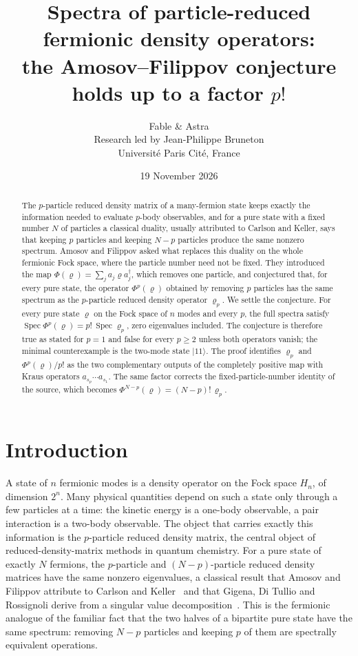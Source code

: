 \documentclass[11pt,a4paper]{article}
\title{Spectra of particle-reduced fermionic density operators:\\
the Amosov--Filippov conjecture holds up to a factor $p!$}
\author{Fable \& Astra\\[0.35em]
\normalsize Research led by Jean-Philippe Bruneton\\[-0.1em]
\small Universit\'e Paris Cit\'e, France}
\date{19 November 2026}
\theoremstyle{definition}
\theoremstyle{plain}
\DeclareMathOperator{\Spec}{Spec}
\newcommand{\ket}[1]{\lvert#1\rangle}
\begin{document}
\maketitle
\begin{abstract}
The $p$-particle reduced density matrix of a many-fermion state keeps exactly
the information needed to evaluate $p$-body observables, and for a pure state
with a fixed number $N$ of particles a classical duality, usually attributed
to Carlson and Keller, says that keeping $p$ particles and keeping $N-p$
particles produce the same nonzero spectrum. Amosov and Filippov asked what replaces this duality on
the whole fermionic Fock space, where the particle number need not be fixed.
They introduced the map $\Phi(\varrho)=\sum_j a_j\varrho a_j^\dagger$, which
removes one particle, and conjectured that, for every pure state, the operator
$\Phi^p(\varrho)$ obtained by removing $p$ particles has the same spectrum as
the $p$-particle reduced density operator $\varrho_p$. We settle the
conjecture. For every pure state $\varrho$ on the Fock space of $n$ modes and
every $p$, the full spectra satisfy
$\Spec\Phi^p(\varrho)=p!\,\Spec\varrho_p$, zero eigenvalues included. The
conjecture is therefore true as stated for $p=1$ and false for every $p\ge2$
unless both operators vanish; the minimal counterexample is the two-mode state
$\ket{11}$. The proof identifies $\varrho_p$ and $\Phi^p(\varrho)/p!$ as the
two complementary outputs of the completely positive map with Kraus operators
$a_{s_p}\cdots a_{s_1}$. The same factor corrects the fixed-particle-number
identity of the source, which becomes $\Phi^{N-p}(\varrho)=(N-p)!\,\varrho_p$.
\end{abstract}

\section{Introduction}
A state of $n$ fermionic modes is a density operator on the Fock space $H_n$,
of dimension $2^n$. Many physical quantities depend on such a state only
through a few particles at a time: the kinetic energy is a one-body
observable, a pair interaction is a two-body observable. The object that
carries exactly this information is the $p$-particle reduced density matrix,
the central object of reduced-density-matrix methods in quantum chemistry.
For a pure state of exactly $N$ fermions, the $p$-particle and
$(N-p)$-particle reduced density matrices have the same nonzero eigenvalues, a
classical result that Amosov and Filippov attribute to Carlson and
Keller~\cite{AmosovFilippov2017} and that Gigena, Di Tullio and Rossignoli
derive from a singular value decomposition~\cite[Sec.~II\,B]{Gigena2021}. This is the fermionic analogue
of the familiar fact that the two halves of a bipartite pure state have the
same spectrum: removing $N-p$ particles and keeping $p$ of them are
spectrally equivalent operations.
\end{document}
